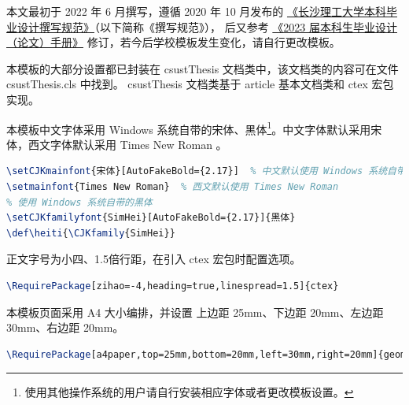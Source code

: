 
本文最初于 2022 年 6 月撰写，遵循 2020 年 10 月发布的
\href{https://www.csust.edu.cn/jwc/info/1142/3568.htm}{《长沙理工大学本科毕业设计撰写规范》}（以下简称《撰写规范》），
后又参考 \href{https://www.csust.edu.cn/jwc/info/1142/5294.htm}{《2023 届本科生毕业设计（论文）手册》}
修订，若今后学校模板发生变化，请自行更改模板。


本模板的大部分设置都已封装在 csustThesis 文档类中，该文档类的内容可在文件 csustThesis.cls 中找到。 csustThesis 文档类基于 article 基本文档类和 ctex 宏包实现。


本模板中文字体采用 Windows 系统自带的宋体、黑体\footnote{使用其他操作系统的用户请自行安装相应字体或者更改模板设置。}。中文字体默认采用宋体，西文字体默认采用 Times New Roman 。
\begin{lstlisting}[numbers=none,language=TeX]
% 默认字体设置
\setCJKmainfont{宋体}[AutoFakeBold={2.17}]  % 中文默认使用 Windows 系统自带的宋体
\setmainfont{Times New Roman}  % 西文默认使用 Times New Roman
% 使用 Windows 系统自带的黑体
\setCJKfamilyfont{SimHei}[AutoFakeBold={2.17}]{黑体}
\def\heiti{\CJKfamily{SimHei}}
\end{lstlisting}

正文字号为小四、1.5倍行距，在引入 ctex 宏包时配置选项。
\begin{lstlisting}[numbers=none,language=TeX]
\RequirePackage[zihao=-4,heading=true,linespread=1.5]{ctex}
\end{lstlisting}


本模板页面采用 A4 大小编排，并设置 上边距 25mm、下边距 20mm、左边距 30mm、右边距 20mm。
\begin{lstlisting}[numbers=none,language=TeX]
\RequirePackage[a4paper,top=25mm,bottom=20mm,left=30mm,right=20mm]{geometry}
\end{lstlisting}

